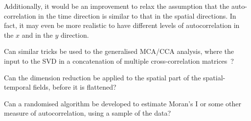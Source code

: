 \documentclass{acm_proc_article-sp}
\begin{document}
Additionally, it would be an improvement to relax the assumption that the auto-correlation in the time direction is similar to that in the spatial directions. In fact, it may even be more realistic to have different levels of autocorrelation in the $x$ and in the $y$ direction.

Can similar tricks be used to the generalised MCA/CCA analysis, where the input to the SVD in a concatenation of multiple cross-correlation matrices~\cite{Carroll1970, Kettenring1971}?

Can the dimension reduction be applied to the spatial part of the spatial-temporal fields, before it is flattened?

Can a randomised algorithm be developed to estimate Moran's I or some other measure of autocorrelation, using a sample of the data?

{
\footnotesize


}
\end{document}
